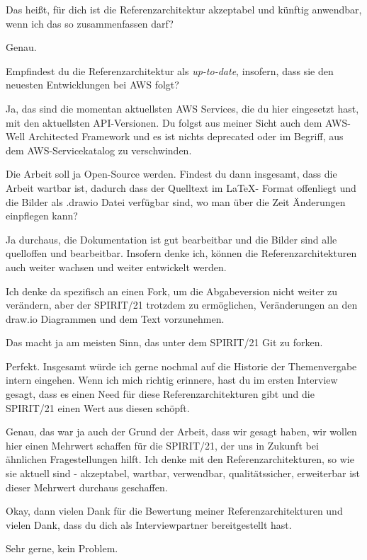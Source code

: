 \LF Das heißt, für dich ist die Referenzarchitektur akzeptabel und künftig anwendbar, wenn ich das so zusammenfassen darf?

\PA Genau.

\LF Empfindest du die Referenzarchitektur als \textit{up-to-date}, insofern, dass sie den neuesten Entwicklungen bei \ac{AWS} folgt?

\PA Ja, das sind die momentan aktuellsten \ac{AWS} Services, die du hier eingesetzt hast, mit den aktuellsten \ac{API}-Versionen. Du folgst aus meiner Sicht auch dem \ac{AWS}-Well Architected Framework und es ist nichts deprecated oder im Begriff, aus dem \ac{AWS}-Servicekatalog zu verschwinden.

\LF Die Arbeit soll ja Open-Source werden. Findest du dann insgesamt, dass die Arbeit wartbar ist, dadurch dass der Quelltext im \LaTeX - Format offenliegt und die Bilder als .drawio Datei verfügbar sind, wo man über die Zeit Änderungen einpflegen kann?

\PA Ja durchaus, die Dokumentation ist gut bearbeitbar und die Bilder sind alle quelloffen und bearbeitbar. Insofern denke ich, können die Referenzarchitekturen auch weiter wachsen und weiter entwickelt werden.

\LF Ich denke da spezifisch an einen Fork, um die Abgabeversion nicht weiter zu verändern, aber der SPIRIT/21 trotzdem zu ermöglichen, Veränderungen an den draw.io Diagrammen und dem Text vorzunehmen.

\PA Das macht ja am meisten Sinn, das unter dem SPIRIT/21 Git zu forken.

\LF Perfekt. Insgesamt würde ich gerne nochmal auf die Historie der Themenvergabe intern eingehen. Wenn ich mich richtig erinnere, hast du im ersten Interview gesagt, dass es einen Need für diese Referenzarchitekturen gibt und die SPIRIT/21 einen Wert aus diesen schöpft.

\PA Genau, das war ja auch der Grund der Arbeit, dass wir gesagt haben, wir wollen hier einen Mehrwert schaffen für die SPIRIT/21, der uns in Zukunft bei ähnlichen Fragestellungen hilft. Ich denke mit den Referenzarchitekturen, so wie sie aktuell sind - akzeptabel, wartbar, verwendbar, qualitätssicher, erweiterbar ist dieser Mehrwert durchaus geschaffen.

\LF Okay, dann vielen Dank für die Bewertung meiner Referenzarchitekturen und vielen Dank, dass du dich als Interviewpartner bereitgestellt hast.

\PA Sehr gerne, kein Problem.